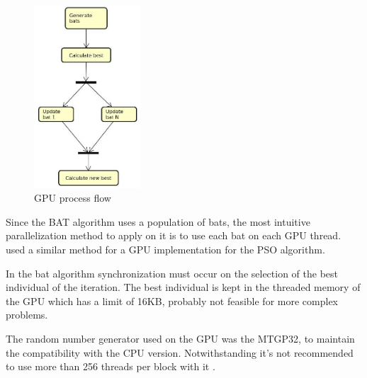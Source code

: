 \documentclass[conference]{IEEEtran}
\begin{document}
\begin{figure}
    \begin{center}
    \includegraphics[width=150,heigth=200px]{activity}
    \end{center}
    \caption{GPU process flow}
\end{figure}

Since the BAT algorithm uses a population of bats, the most intuitive
parallelization method to apply on it is to use each bat on each GPU
thread. \cite{pso-gpu} used a similar method for a GPU implementation
for the PSO algorithm.

In the bat algorithm synchronization must occur on the selection of the
best individual of the iteration. The best individual is kept in the
threaded memory of the GPU which has a limit of 16KB, probably not feasible for
more complex problems.

The random number generator used on the GPU was the MTGP32, to
maintain the compatibility with the CPU version. Notwithstanding
it's not recommended to use more than 256 threads per block with it
\cite{curandIssue}.
\end{document}
